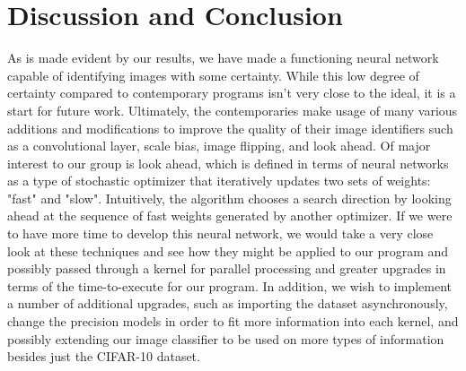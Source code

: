 \documentclass[conference]{IEEEtran}
\begin{document}
\begin{table}
\caption{Testing results on the A100 GPU}
\label{tab:resultsTable}
\end{table}

\begin{table}
\caption{Our results compared with Keller Jordan's program}
\label{tab:jordanKellerResults}
\end{table}

\section{Discussion and Conclusion}

As is made evident by our results, we have made a functioning neural network capable of identifying images with some certainty. While this low degree of certainty compared to contemporary programs isn't very close to the ideal, it is a start for future work. Ultimately, the contemporaries make usage of many various additions and modifications to improve the quality of their image identifiers such as a convolutional layer, scale bias, image flipping, and look ahead. Of major interest to our group is look ahead, which is defined in terms of neural networks as a type of stochastic optimizer that iteratively updates two sets of weights: "fast" and "slow". Intuitively, the algorithm chooses a search direction by looking ahead at the sequence of fast weights generated by another optimizer\cite{b4}. If we were to have more time to develop this neural network, we would take a very close look at these techniques and see how they might be applied to our program and possibly passed through a kernel for parallel processing and greater upgrades in terms of the time-to-execute for our program. In addition, we wish to implement a number of additional upgrades, such as importing the dataset asynchronously, change the precision models in order to fit more information into each kernel, and possibly extending our image classifier to be used on more types of information besides just the CIFAR-10 dataset.
\end{document}
